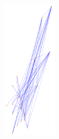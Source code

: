 \documentclass{article}
\newcommand{\wFour}{0.24\textwidth}
\begin{document}
\begin{figure}
{    \includegraphics[width=\wFour]{plot/map.sym-n.ax.ucidata-zachary}}
\end{figure}
\end{document}

